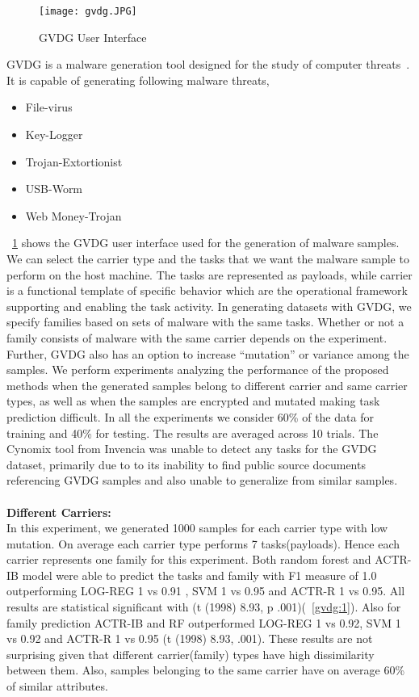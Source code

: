 \documentclass[conference]{IEEEtran}
\begin{document}
\begin{figure}[htb!]
	\centerline{\texttt{[image: gvdg.JPG]}}
	
	\caption{\textmd{GVDG User Interface}}
	
	\label{gvdg}
\end{figure}
\vspace{-2em}
GVDG is a malware generation tool designed for the study of computer threats~\cite{gvdg}. It is capable of generating following malware threats,
\begin{itemize}
	\setlength\itemsep{-0.1em}
	\item File-virus
	\item Key-Logger
	\item Trojan-Extortionist 
	\item USB-Worm
	\item Web Money-Trojan
\end{itemize}



\figurename~\ref{gvdg} shows the GVDG user interface used for the generation of malware samples. We can select the carrier type and the tasks that we want the malware sample to perform on the host machine. The tasks are represented as payloads, while carrier is a functional template of specific behavior which are the operational framework supporting and enabling the task activity. In generating datasets with GVDG, we specify families based on sets of malware with the same tasks.  Whether or not a family consists of malware with the same carrier depends on the experiment.  Further, GVDG also has an option to increase ``mutation'' or variance among the samples. We perform experiments analyzing the performance of the proposed methods when the generated samples belong to different carrier and same carrier types, as well as when the samples are encrypted and mutated making task prediction difficult.  In all the experiments we consider 60\% of the data for training and 40\% for testing. The results are averaged across 10 trials. The Cynomix tool from Invencia was unable to detect any tasks for the GVDG dataset, primarily due to to its inability to find public source documents referencing GVDG samples and also unable to generalize from similar samples.\\\\
{\bf Different Carriers:}\\
In this experiment, we generated 1000 samples for each carrier type with low mutation. On average each carrier type performs 7 tasks(payloads). Hence each carrier represents one family for this experiment. Both random forest and ACTR-IB model were able to predict the tasks and family with F1 measure of 1.0 outperforming LOG-REG 1 vs 0.91 , SVM 1 vs 0.95 and ACTR-R 1 vs 0.95. All results are statistical significant with (t (1998)  8.93, p  .001)(\figurename~\ref{gvdg:1}). Also for family prediction ACTR-IB and RF outperformed LOG-REG 1 vs 0.92, SVM 1 vs 0.92  and ACTR-R 1 vs 0.95 (t (1998)  8.93,  .001).  These results are not surprising given that different carrier(family) types have high dissimilarity between them. Also, samples belonging to the same carrier have on average 60\% of similar attributes.
\end{document}
